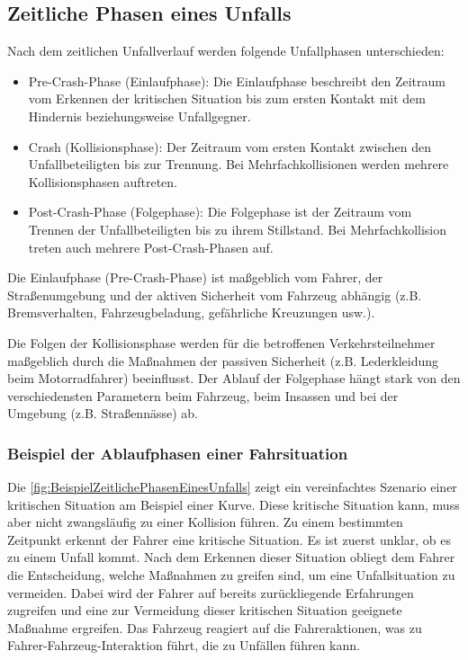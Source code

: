 %
\subsection{Zeitliche Phasen eines Unfalls}

Nach dem zeitlichen Unfallverlauf werden folgende Unfallphasen unterschieden:
\begin{itemize}
	\item Pre-Crash-Phase (Einlaufphase): 
	Die Einlaufphase beschreibt den Zeitraum vom Erkennen der kritischen Situation bis zum ersten Kontakt mit dem Hindernis beziehungsweise Unfallgegner.
	\item Crash (Kollisionsphase):
	Der Zeitraum vom ersten Kontakt zwischen den Unfallbeteiligten bis zur Trennung. Bei Mehrfachkollisionen werden mehrere Kollisionsphasen auftreten.
	\item Post-Crash-Phase (Folgephase):
	Die Folgephase ist der Zeitraum vom Trennen der Unfallbeteiligten bis zu ihrem Stillstand. Bei Mehrfachkollision treten auch mehrere Post-Crash-Phasen auf. 
	
\end{itemize}
Die Einlaufphase (Pre-Crash-Phase) ist maßgeblich vom Fahrer, der Straßenumgebung und der aktiven Sicherheit vom Fahrzeug abhängig (z.B. Bremsverhalten, Fahrzeugbeladung, gefährliche Kreuzungen usw.).
 
Die Folgen der Kollisionsphase werden für die betroffenen Verkehrsteilnehmer maßgeblich durch die Maßnahmen der passiven Sicherheit (z.B. Lederkleidung beim Motorradfahrer) beeinflusst. Der Ablauf der Folgephase hängt stark von den verschiedensten Parametern beim Fahrzeug, beim Insassen und bei der Umgebung (z.B. Straßennässe) ab.\citep{Appel2002}\\


\subsubsection{Beispiel der Ablaufphasen einer Fahrsituation}

Die \autoref{fig:BeispielZeitlichePhasenEinesUnfalls} zeigt ein vereinfachtes Szenario einer kritischen Situation am Beispiel einer Kurve. Diese kritische Situation kann, muss aber nicht zwangsläufig zu einer Kollision führen. Zu einem bestimmten Zeitpunkt erkennt der Fahrer eine kritische Situation. Es ist zuerst unklar, ob es zu einem Unfall kommt. Nach dem Erkennen dieser Situation obliegt dem Fahrer die Entscheidung, welche Maßnahmen zu greifen sind, um eine Unfallsituation zu vermeiden. Dabei wird der Fahrer auf bereits zurückliegende Erfahrungen zugreifen und eine zur Vermeidung dieser kritischen Situation geeignete Maßnahme ergreifen. Das Fahrzeug reagiert auf die Fahreraktionen, was zu \glqq Fahrer-Fahrzeug-Interaktion\grqq{} führt, die zu Unfällen führen kann.\citep{Appel2002}\\


